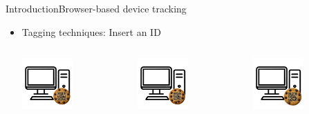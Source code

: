 \documentclass[aspectratio=169, hyperref={colorlinks=true, allcolors=SecondaryColor}, c]{beamer}
\begin{document}
\begin{frame}[fragile]{Introduction}{Browser-based device tracking}
	\begin{itemize}
		\item \alert{Tagging techniques:} Insert an ID
		\begin{columns}
			\begin{column}{0.33\textwidth}
				\includegraphics[width=0.5\textwidth, center]{./figures/computer_alpha_cookie_1.png}
			\end{column}
			\begin{column}{0.33\textwidth}
				\includegraphics[width=0.5\textwidth, center]{./figures/computer_alpha_cookie_2.png}
			\end{column}
			\begin{column}{0.33\textwidth}
				\includegraphics[width=0.5\textwidth, center]{./figures/computer_alpha_cookie_3.png}

\end{column}
\end{columns}
\end{itemize}
\end{frame}
\end{document}
